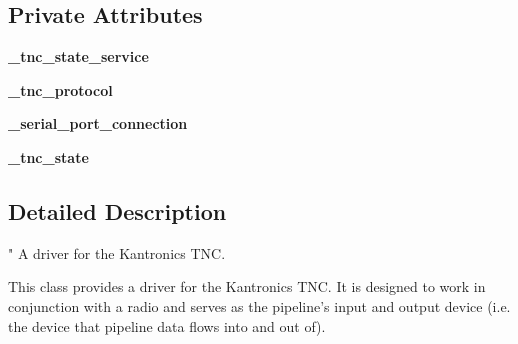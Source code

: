 \subsection*{Private Attributes}
\begin{DoxyCompactItemize}
\item 
\hypertarget{classhwm_1_1hardware_1_1devices_1_1drivers_1_1kantronics__tnc_1_1kantronics__tnc_1_1_kantronics___t_n_c_ae3fdb57793b47806fecbaea131c0cbb6}{{\bfseries \-\_\-tnc\-\_\-state\-\_\-service}}\label{classhwm_1_1hardware_1_1devices_1_1drivers_1_1kantronics__tnc_1_1kantronics__tnc_1_1_kantronics___t_n_c_ae3fdb57793b47806fecbaea131c0cbb6}

\item 
\hypertarget{classhwm_1_1hardware_1_1devices_1_1drivers_1_1kantronics__tnc_1_1kantronics__tnc_1_1_kantronics___t_n_c_aa3905712cb1c219666bd3e46b853cbd5}{{\bfseries \-\_\-tnc\-\_\-protocol}}\label{classhwm_1_1hardware_1_1devices_1_1drivers_1_1kantronics__tnc_1_1kantronics__tnc_1_1_kantronics___t_n_c_aa3905712cb1c219666bd3e46b853cbd5}

\item 
\hypertarget{classhwm_1_1hardware_1_1devices_1_1drivers_1_1kantronics__tnc_1_1kantronics__tnc_1_1_kantronics___t_n_c_a7b342bdb9c9bac6e4128af6d810e39ce}{{\bfseries \-\_\-serial\-\_\-port\-\_\-connection}}\label{classhwm_1_1hardware_1_1devices_1_1drivers_1_1kantronics__tnc_1_1kantronics__tnc_1_1_kantronics___t_n_c_a7b342bdb9c9bac6e4128af6d810e39ce}

\item 
\hypertarget{classhwm_1_1hardware_1_1devices_1_1drivers_1_1kantronics__tnc_1_1kantronics__tnc_1_1_kantronics___t_n_c_abf046a9d9fa45d23ff6cd4927263850f}{{\bfseries \-\_\-tnc\-\_\-state}}\label{classhwm_1_1hardware_1_1devices_1_1drivers_1_1kantronics__tnc_1_1kantronics__tnc_1_1_kantronics___t_n_c_abf046a9d9fa45d23ff6cd4927263850f}

\end{DoxyCompactItemize}


\subsection{Detailed Description}
" A driver for the Kantronics T\-N\-C. 

This class provides a driver for the Kantronics T\-N\-C. It is designed to work in conjunction with a radio and serves as the pipeline's input and output device (i.\-e. the device that pipeline data flows into and out of). 

